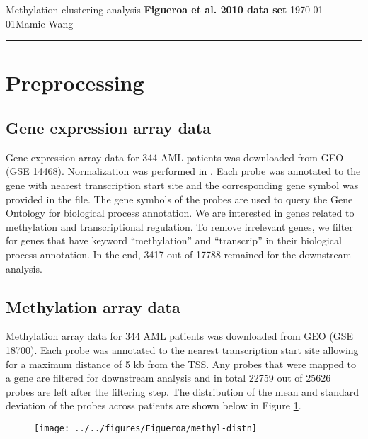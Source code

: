 \documentclass{article}
\begin{document}
\noindent
Methylation clustering analysis \hfill \textbf{Figueroa et al. 2010 data set} \newline 
\today \hfill Mamie Wang

\noindent
\rule{\linewidth}{0.4pt}

\listoffigures

\clearpage

\section{Preprocessing}

\subsection{Gene expression array data}

Gene expression array data for 344 AML patients was downloaded from GEO \href{https://www.ncbi.nlm.nih.gov/geo/query/acc.cgi?acc=GSE14468}{(GSE 14468)}. Normalization was performed in \cite{gentles2015prognostic}. Each probe was annotated to the gene with nearest transcription start site and the corresponding gene symbol was provided in the file. The gene symbols of the probes are used to query the Gene Ontology \cite{ashburner2000gene} for biological process annotation. We are interested in genes related to methylation and transcriptional regulation. To remove irrelevant genes, we filter for genes that have keyword ``methylation'' and ``transcrip'' in their biological process annotation. In the end, 3417 out of 17788 remained for the downstream analysis. 

\subsection{Methylation array data}

Methylation array data for 344 AML patients was downloaded from GEO \href{https://www.ncbi.nlm.nih.gov/geo/query/acc.cgi?acc=GSE18700}{(GSE 18700)}. Each probe was annotated to the nearest transcription start site allowing for a maximum distance of 5 kb from the TSS. Any probes that were mapped to a gene are filtered for downstream analysis and in total 22759 out of 25626 probes are left after the filtering step. The distribution of the mean and standard deviation of the probes across patients are shown below in Figure \ref{methylDistn}. 

\begin{figure}[htbp]
\begin{center}
\texttt{[image: ../../figures/Figueroa/methyl-distn]}
\caption[Mean and standard deviation of the raw methylation data]{}
\label{methylDistn}
\end{center}
\end{figure}
\end{document}

